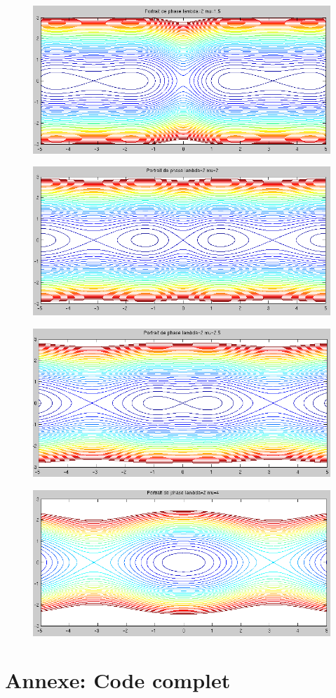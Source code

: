 \documentclass[11pt]{article}
\begin{document}
\begin{figure}[h!]
	\centering
	\includegraphics[scale=0.65]{Figures/rapport_pp15.png}
\end{figure}

\begin{figure}[h!]
	\centering
	\includegraphics[scale=0.65]{Figures/rapport_pp20.png}
\end{figure}
\newpage %
\begin{figure}[h!]
	\centering
	\includegraphics[scale=0.66]{Figures/rapport_pp25.png}
\end{figure}
\newpage
\begin{figure}[h!]
	\centering
	\includegraphics[scale=0.65]{Figures/rapport_pp40.png}
\end{figure}


\newpage
\section{Annexe: Code complet}

\end{document}
